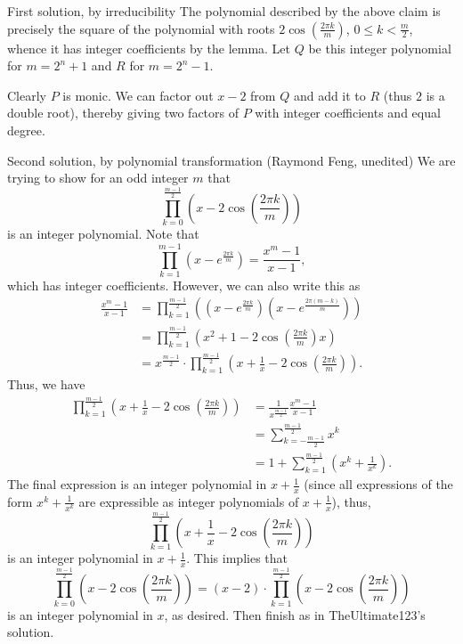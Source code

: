 \begin{customenv}{First solution, by irreducibility}
    The polynomial described by the above claim is precisely the square of the polynomial with roots $2\cos(\frac{2\pi k}m)$, $0\le k<\frac m2$, whence it has integer coefficients by the lemma. Let $Q$ be this integer polynomial for $m=2^n+1$ and $R$ for $m=2^n-1$.

    Clearly $P$ is monic. We can factor out $x-2$ from $Q$ and add it to $R$ (thus $2$ is a double root), thereby giving two factors of $P$ with integer coefficients and equal degree.
\end{customenv}
\begin{customenv}{Second solution, by polynomial transformation (Raymond Feng, unedited)}
    We are trying to show for an odd integer $m$ that\[\prod_{k=0}^{\frac{m-1}2} \left(x-2\cos\left(\frac{2\pi k}{m}\right)\right)\]is an integer polynomial. Note that\[\prod_{k=1}^{m-1} \left(x-e^{\frac{2\pi k}{m}}\right) = \frac{x^m-1}{x-1},\]which has integer coefficients. However, we can also write this as
    \begin{align*}
        \frac{x^m-1}{x-1}&=\prod_{k=1}^{\frac{m-1}2} \left(\left(x-e^{\frac{2\pi k}{m}}\right)\left(x-e^{\frac{2\pi (m-k)}{m}}\right)\right)\\
        &= \prod_{k=1}^{\frac{m-1}2} \left(x^2+1-2\cos\left(\frac{2\pi k}{m}\right)x\right)\\
        &= x^{\frac{m-1}2}\cdot \prod_{k=1}^{\frac{m-1}2} \left(x+\frac1x-2\cos\left(\frac{2\pi k}{m}\right)\right).
    \end{align*}
    Thus, we have
    \begin{align*}
        \prod_{k=1}^{\frac{m-1}2} \left(x+\frac1x-2\cos\left(\frac{2\pi k}{m}\right)\right) &= \frac1{x^{\frac{m-1}2}} \frac{x^m-1}{x-1}\\
        &= \sum_{k=-\frac{m-1}2}^{\frac{m-1}2}x^k\\
        &= 1+\sum_{k=1}^{\frac{m-1}2} \left(x^k+\frac1{x^k}\right).
    \end{align*}
    The final expression is an integer polynomial in $x+\frac1x$ (since all expressions of the form $x^k+\frac1{x^k}$ are expressible as integer polynomials of $x+\frac1x$), thus,\[\prod_{k=1}^{\frac{m-1}2} \left(x+\frac1x-2\cos\left(\frac{2\pi k}{m}\right)\right)\]is an integer polynomial in $x+\frac1x$. This implies that\[\prod_{k=0}^{\frac{m-1}2} \left(x-2\cos\left(\frac{2\pi k}{m}\right)\right) = (x-2)\cdot \prod_{k=1}^{\frac{m-1}2} \left(x-2\cos\left(\frac{2\pi k}{m}\right)\right)\]is an integer polynomial in $x$, as desired. Then finish as in TheUltimate123's solution.
\end{customenv}

